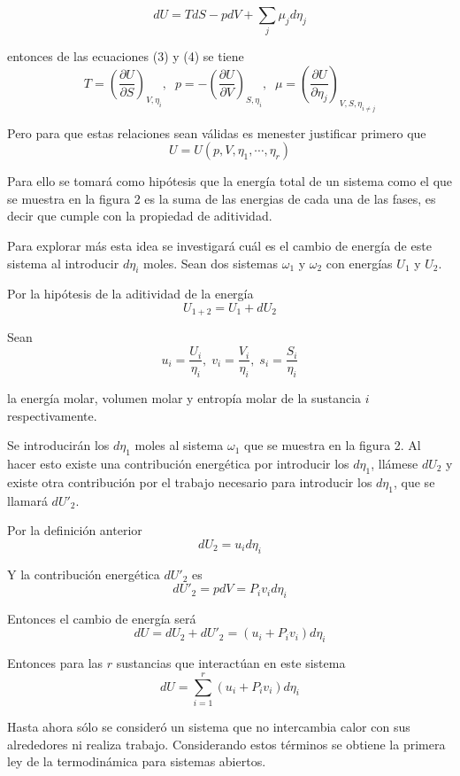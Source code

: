 \documentclass[a4paper,12pt]{article}
\begin{document}
\begin{equation}
	d U = T dS - p dV + \sum_j \mu_j d \eta_j
\end{equation}

entonces de las ecuaciones (3) y (4) se tiene
\[
	T = \left (\frac{\partial U}{\partial S}  \right )_{V, \eta_i}, \; \; p = - \left ( \frac{\partial U}{\partial V} \right )_{S, \eta_i}, \; \; \mu = \left ( \frac{\partial U}{\partial \eta_j} \right )_{V, S, \eta_{i \neq j}}
\]

Pero para que estas relaciones sean válidas es menester justificar primero que
\[
	U = U(p, V, \eta_1, \cdots, \eta_r)
\]

Para ello se tomará como hipótesis que la energía total de un sistema como el que se muestra en la figura 2 es la suma de las energias de cada una de las fases, es decir que cumple con la propiedad de aditividad.

Para explorar más esta idea se investigará cuál es el cambio de energía de este sistema al introducir $d \eta_i$ moles. Sean dos sistemas $\omega_1$ y $\omega_2$ con energías $U_1$ y $U_2$.

Por la hipótesis de la aditividad de la energía
\[
	U_{1+2} = U_1 + d U_2
\]

Sean
\[
	u_i = \frac{U_i}{\eta_i}, \; v_i = \frac{V_i}{\eta_i}, \; s_i = \frac{S_i}{\eta_i}
\]

la energía molar, volumen molar y entropía molar de la sustancia $i$ respectivamente.

Se introducirán los $d \eta_1$ moles al sistema $\omega_1$ que se muestra en la figura 2. Al hacer esto existe una contribución energética por introducir los $d \eta_1$, llámese $dU_2$ y existe otra contribución por el trabajo necesario para introducir los $d \eta_1$, que se llamará $dU'_2$.

Por la definición anterior
\[
	dU_2 = u_i d \eta_i
\]

Y la contribución energética $dU'_2$ es
\[
	dU'_2 = p dV = P_i v_i d \eta_i
\]

Entonces el cambio de energía será
\[
	dU = dU_2 + dU'_2 = (u_i + P_i v_i) d \eta_i
\]

Entonces para las $r$ sustancias que interactúan en este sistema
\[
	dU = \sum_{i=1}^r (u_i + P_i v_i) d \eta_i
\]

Hasta ahora sólo se consideró un sistema que no intercambia calor con sus alrededores ni realiza trabajo. Considerando estos términos se obtiene la primera ley de la termodinámica para sistemas abiertos.
\end{document}
